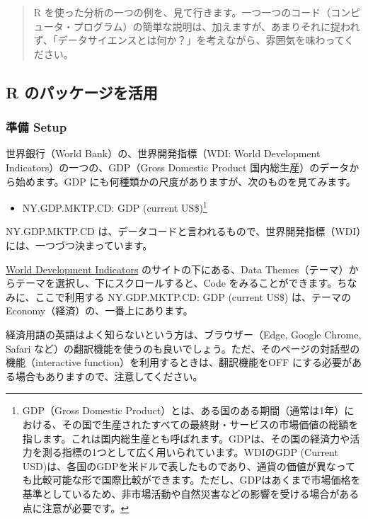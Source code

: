 \documentclass[
  xelatex, ja=standard]{bxjsbook}
\providecommand{\tightlist}{%
  \setlength{\itemsep}{0pt}\setlength{\parskip}{0pt}}
\theoremstyle{definition}
\theoremstyle{definition}
\theoremstyle{definition}
\theoremstyle{definition}
\theoremstyle{remark}
\begin{document}
\begin{quote}
R を使った分析の一つの例を、見て行きます。一つ一つのコード（コンピュータ・プログラム）の簡単な説明は、加えますが、あまりそれに捉われず、「データサイエンスとは何か？」を考えながら、雰囲気を味わってください。
\end{quote}

\hypertarget{r-ux306eux30d1ux30c3ux30b1ux30fcux30b8ux3092ux6d3bux7528-1}{%
\subsection{R のパッケージを活用}\label{r-ux306eux30d1ux30c3ux30b1ux30fcux30b8ux3092ux6d3bux7528-1}}

\hypertarget{ux6e96ux5099-setup-1}{%
\subsubsection{準備 Setup}\label{ux6e96ux5099-setup-1}}

世界銀行（World Bank）の、世界開発指標（WDI: World Development Indicators）の一つの、GDP（Gross Domestic Product 国内総生産）のデータから始めます。GDP にも何種類かの尺度がありますが、次のものを見てみます。

\begin{itemize}
\tightlist
\item
  NY.GDP.MKTP.CD: GDP (current US\$)\footnote{GDP（Gross Domestic Product）とは、ある国のある期間（通常は1年）における、その国で生産されたすべての最終財・サービスの市場価値の総額を指します。これは国内総生産とも呼ばれます。GDPは、その国の経済力や活力を測る指標の1つとして広く用いられています。WDIのGDP (Current USD)は、各国のGDPを米ドルで表したものであり、通貨の価値が異なっても比較可能な形で国際比較ができます。ただし、GDPはあくまで市場価格を基準としているため、非市場活動や自然災害などの影響を受ける場合がある点に注意が必要です。}
\end{itemize}

NY.GDP.MKTP.CD は、データコードと言われるもので、世界開発指標（WDI）には、一つづつ決まっています。

\href{https://datatopics.worldbank.org/world-development-indicators/}{World Development Indicators} のサイトの下にある、Data Themes（テーマ）からテーマを選択し、下にスクロールすると、Code をみることができます。ちなみに、ここで利用する NY.GDP.MKTP.CD: GDP (current US\$) は、テーマの Economy（経済）の、一番上にあります。

経済用語の英語はよく知らないという方は、ブラウザー（Edge, Google Chrome, Safari など）の翻訳機能を使うのも良いでしょう。ただ、そのページの対話型の機能（interactive function）を利用するときは、翻訳機能をOFF にする必要がある場合もありますので、注意してください。
\end{document}
